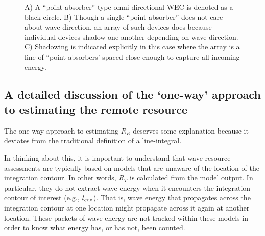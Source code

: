 \begin{figure}[ht]
    \centering
    \caption{A) A ``point absorber'' type omni-directional WEC is denoted as a black circle. B) Though a single ``point absorber'' does not care about wave-direction, an array of such devices does because individual devices shadow one-another depending on wave direction. C) Shadowing is indicated explicitly in this case where the array is a line of ``point absorbers' spaced close enough to capture all incoming energy.}
    \label{fig:omni-dir}
\end{figure}

\subsection{A detailed discussion of the `one-way' approach to estimating the remote resource}

The one-way approach to estimating $R_R$ deserves some explanation because it deviates from the traditional definition of a line-integral.

In thinking about this, it is important to understand that wave resource assessments are typically based on models that are unaware of the location of the integration contour. In other words, $R_T$ is calculated from the model output. In particular, they do not extract wave energy when it encounters the integration contour of interest (e.g., $l_{eez}$). That is, wave energy that propagates across the integration contour at one location might propagate across it again at another location. These packets of wave energy are not tracked within these models in order to know what energy has, or has not, been counted. 

